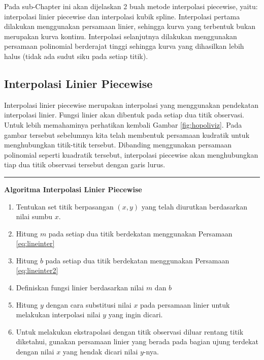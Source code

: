 \documentclass[]{book}
\providecommand{\tightlist}{%
  \setlength{\itemsep}{0pt}\setlength{\parskip}{0pt}}
\theoremstyle{definition}
\theoremstyle{definition}
\theoremstyle{definition}
\theoremstyle{remark}
\begin{document}
Pada sub-Chapter ini akan dijelaskan 2 buah metode interpolasi piecewise, yaitu: interpolasi linier piecewise dan interpolasi kubik spline. Interpolasi pertama dilakukan menggunakan persamaan linier, sehingga kurva yang terbentuk bukan merupakan kurva kontinu. Interpolasi selanjutnya dilakukan menggunakan persamaan polinomial berderajat tinggi sehingga kurva yang dihasilkan lebih halus (tidak ada sudut siku pada setiap titik).

\hypertarget{pwlininter}{%
\subsection{Interpolasi Linier Piecewise}\label{pwlininter}}

Interpolasi linier piecewise merupakan interpolasi yang menggunakan pendekatan interpolasi linier. Fungsi linier akan dibentuk pada setiap dua titik observasi. Untuk lebih memahaminya perhatikan kembali Gambar \ref{fig:hopoliviz}. Pada gambar tersebut sebelumnya kita telah membentuk persamaan kudratik untuk menghubungkan titik-titik tersebut. Dibanding menggunakan persamaan polinomial seperti kuadratik tersebut, interpolasi piecewise akan menghubungkan tiap dua titik observasi tersebut dengan garis lurus.

\begin{center}\rule{0.5\linewidth}{\linethickness}\end{center}

\textbf{Algoritma Interpolasi Linier Piecewise}

\begin{enumerate}
\def\labelenumi{\arabic{enumi}.}
\tightlist
\item
  Tentukan set titik berpasangan \(\left(x,y\right)\) yang telah diurutkan berdasarkan nilai sumbu \(x\).
\item
  Hitung \(m\) pada setiap dua titik berdekatan menggunakan Persamaan \eqref{eq:lineinter}
\item
  Hitung \(b\) pada setiap dua titik berdekatan menggunakan Persamaan \eqref{eq:lineinter2}
\item
  Definiskan fungsi linier berdasarkan nilai \(m\) dan \(b\)
\item
  Hitung \(y\) dengan cara substitusi nilai \(x\) pada persamaan linier untuk melakukan interpolasi nilai \(y\) yang ingin dicari.
\item
  Untuk melakukan ekstrapolasi dengan titik observasi diluar rentang titik diketahui, gunakan persamaan linier yang berada pada bagian ujung terdekat dengan nilai \(x\) yang hendak dicari nilai \(y\)-nya.
\end{enumerate}
\end{document}
